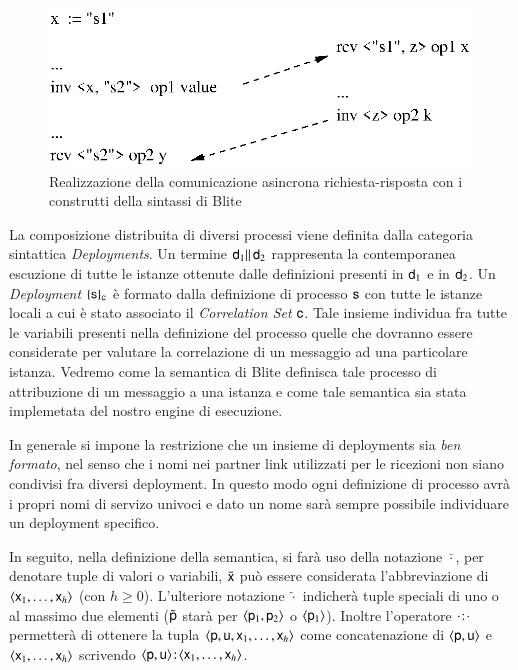 \begin{figure}[t]
\begin{center}
  \includegraphics{linguaggio/dia/com}
   \caption[Comunicazione asincrona con Blite]{
   	\textsf{{\small Realizzazione della comunicazione asincrona
   	richiesta-risposta con i construtti della sintassi di Blite}} }
  \label{fig:lin:com}
\end{center}
\end{figure}

La composizione distribuita di diversi processi viene definita dalla categoria
sintattica \emph{Deployments}. Un termine ${\sf d}_1 \|\, {\sf d}_2$ rappresenta la
contemporanea escuzione di tutte le istanze ottenute dalle
definizioni presenti in ${\sf d}_1$ e in ${\sf d}_2$. Un \emph{Deployment}
$\{ {\sf s} \}_{{\sf c}}$ è formato dalla definizione di processo ${\sf s}$ con tutte le 
istanze locali a cui è stato associato il \emph{Correlation Set} ${\sf c}$. Tale
insieme individua fra tutte le variabili presenti nella definizione del
processo quelle che dovranno essere considerate per valutare la correlazione di un messaggio
ad una particolare istanza. Vedremo come la semantica di Blite definisca tale
processo di attribuzione di un messaggio a una istanza e come tale
semantica sia stata implemetata del nostro engine di esecuzione.
 
In generale si impone la restrizione che un insieme di deployments sia
\emph{ben formato}, nel senso che i nomi nei partner link utilizzati per le
ricezioni non siano condivisi fra diversi deployment. In questo modo ogni
definizione di processo avrà i propri nomi di servizo univoci e dato un nome
sarà sempre possibile individuare un deployment specifico.

In seguito, nella definizione della semantica, si farà uso della notazione
$\bar{\cdot}$, per denotare tuple di valori o variabili, $\bar{{\sf x}}$ può
essere considerata l'abbreviazione di $\langle {\sf x}_1,
\ldots, {\sf x}_h \rangle$ (con $h \geq 0$). L'ulteriore notazione $\tilde{\cdot}$
indicherà tuple speciali di uno o al massimo due elementi ($\tilde{{\sf p}}$ starà
per $\langle {\sf p}_1, {\sf p}_2 \rangle$ o $\langle {\sf p}_1 \rangle$). Inoltre l'operatore
${\sf \cdot}\! : \! {\sf \cdot}$ permetterà di ottenere la tupla $\langle {\sf p},
{\sf u},{\sf x}_1,\ldots,{\sf x}_h \rangle$ come concatenazione di $\langle {\sf p}, {\sf u} \rangle$ e
$\langle {\sf x}_1,\ldots,{\sf x}_h \rangle$ scrivendo $\langle {\sf p},
{\sf u} \rangle\! : \! \langle {\sf x}_1,\ldots,{\sf x}_h \rangle$.
\\

